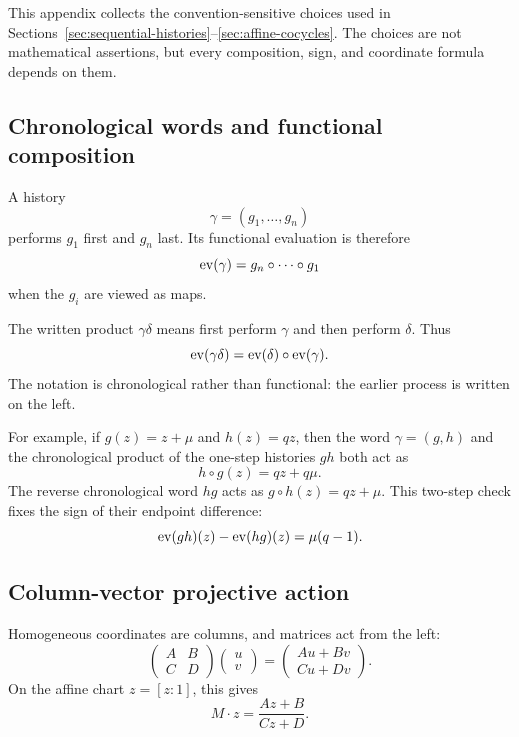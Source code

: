 This appendix collects the convention-sensitive choices used in
Sections~\ref{sec:sequential-histories}--\ref{sec:affine-cocycles}.  The choices
are not mathematical assertions, but every composition, sign, and coordinate
formula depends on them.

\subsection{Chronological words and functional composition}

\begin{convention}
\label{conv:history-order}
A history
\[
  \gamma=(g_1,\ldots,g_n)
\]
performs $g_1$ first and $g_n$ last.  Its functional evaluation is therefore
\[
  \operatorname{ev}(\gamma)=g_n\circ\cdots\circ g_1
\]
when the $g_i$ are viewed as maps.
\end{convention}

\begin{convention}
\label{conv:chronological-concatenation}
The written product $\gamma\delta$ means first perform $\gamma$ and then
perform $\delta$.  Thus
\[
  \operatorname{ev}(\gamma\delta)=\operatorname{ev}(\delta)\circ\operatorname{ev}(\gamma).
\]
The notation is chronological rather than functional: the earlier process is
written on the left.
\end{convention}

For example, if $g(z)=z+\mu$ and $h(z)=qz$, then the word
$\gamma=(g,h)$ and the chronological product of the one-step histories $gh$
both act as
\[
  h\circ g(z)=qz+q\mu.
\]
The reverse chronological word $hg$ acts as $g\circ h(z)=qz+\mu$.  This
two-step check fixes the sign of their endpoint difference:
\[
  \operatorname{ev}(gh)(z)-\operatorname{ev}(hg)(z)=\mu(q-1).
\]

\subsection{Column-vector projective action}

\begin{convention}
\label{conv:column-projective-action}
Homogeneous coordinates are columns, and matrices act from the left:
\[
  \begin{pmatrix}A&B\\C&D\end{pmatrix}
  \begin{pmatrix}u\\v\end{pmatrix}
  =\begin{pmatrix}Au+Bv\\Cu+Dv\end{pmatrix}.
\]
On the affine chart $z=[z:1]$, this gives
\[
  M\cdot z=\frac{Az+B}{Cz+D}.
\]
\end{convention}

